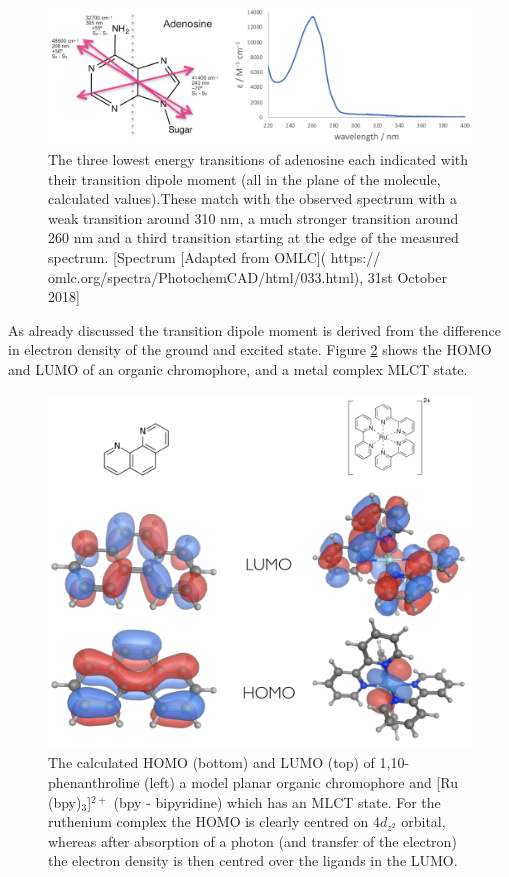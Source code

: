 \documentclass[
]{book}
\begin{document}
\begin{figure}

{\centering \includegraphics[width=1\linewidth]{images/adenosine} 

}

\caption{The three lowest energy transitions of adenosine each indicated with their transition dipole moment (all in the plane of the molecule, calculated values).These match with the observed spectrum with a weak transition around 310 nm, a much stronger transition around 260 nm and a third transition starting at the edge of the measured spectrum. [Spectrum [Adapted from OMLC]( https:// omlc.org/spectra/PhotochemCAD/html/033.html), 31st October 2018]}\label{fig:adenosine}
\end{figure}

As already discussed the transition dipole moment is derived from the difference in electron density of the ground and excited state. Figure \ref{fig:PhenRubpy3} shows the HOMO and LUMO of an organic chromophore, and a metal complex MLCT state.

\begin{figure}

{\centering \includegraphics[width=1\linewidth]{images/PhenRubpy3} 

}

\caption{The calculated HOMO (bottom) and LUMO (top) of 1,10-phenanthroline (left) a model planar organic chromophore and [Ru (bpy)$_3$]$^{2+}$ (bpy - bipyridine) which has an MLCT state. For the ruthenium complex the HOMO is clearly centred on $4d_{z^2}$ orbital, whereas after absorption of a photon (and transfer of the electron) the electron density is then centred over the ligands in the LUMO.}\label{fig:PhenRubpy3}
\end{figure}
\end{document}
